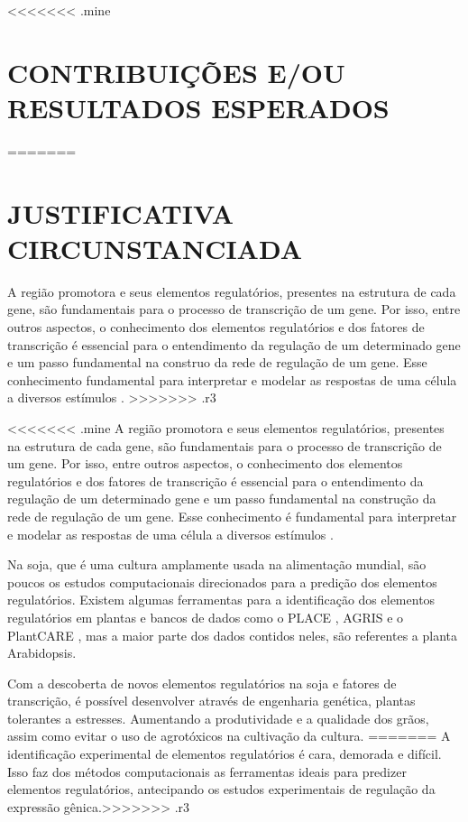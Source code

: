 <<<<<<< .mine
\chapter{CONTRIBUIÇÕES E/OU RESULTADOS ESPERADOS}
=======
\chapter{JUSTIFICATIVA CIRCUNSTANCIADA}
A região promotora e seus elementos regulatórios, presentes na estrutura de cada gene, são fundamentais para o processo de transcrição de um gene. Por isso, entre outros aspectos, o conhecimento dos elementos regulatórios e dos fatores de transcrição é essencial para o entendimento da regulação de um determinado gene \cite{WANG2009} e um passo fundamental na construo da rede de regulação de um gene.  Esse conhecimento  fundamental para interpretar e modelar as respostas de uma célula a diversos estímulos \cite{WASSERMAN2004}.
>>>>>>> .r3

<<<<<<< .mine
A região promotora e seus elementos regulatórios, presentes na estrutura de cada gene, são fundamentais para o processo de transcrição de um gene. Por isso, entre outros aspectos, o conhecimento dos elementos regulatórios e dos fatores de transcrição é essencial para o entendimento da regulação de um determinado gene \cite{WangHaberer2009} e um passo fundamental na construção da rede de regulação de um gene.  Esse conhecimento é fundamental para interpretar e modelar as respostas de uma célula a diversos estímulos \cite{Wasserman2004}.

Na soja, que é uma cultura amplamente usada na alimentação mundial, são poucos os estudos computacionais direcionados para a predição dos elementos regulatórios. Existem algumas ferramentas para a identificação dos elementos regulatórios em plantas e bancos de dados como o PLACE \cite{Higo1999}, AGRIS \cite{Palaniswamy2006} e o PlantCARE \cite{Rombauts1999}, mas a maior parte dos dados contidos neles, são referentes a planta Arabidopsis.

Com a descoberta de novos elementos regulatórios na soja e fatores de transcrição, é possível desenvolver através de engenharia genética, plantas tolerantes a estresses. Aumentando a produtividade e a qualidade dos grãos, assim como evitar o uso de agrotóxicos na cultivação da cultura.
=======
A identificação experimental de elementos regulatórios é  cara, demorada e difícil. Isso faz dos métodos computacionais as ferramentas ideais para predizer elementos regulatórios, antecipando os estudos experimentais de regulação da expressão gênica.>>>>>>> .r3
